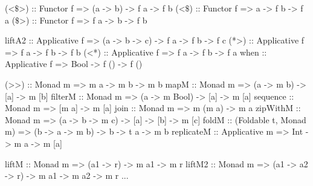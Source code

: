 \documentclass{article}
\begin{document}
\begin{hask}
(<$\$$>) :: Functor f => (a -> b) -> f a -> f b
(<$\$$) :: Functor f => a -> f b -> f a
($\$$>) :: Functor f => f a -> b -> f b

liftA2 :: Applicative f => (a -> b -> c) -> f a -> f b -> f c
(*>) :: Applicative f => f a -> f b -> f b
(<*) :: Applicative f => f a -> f b -> f a
when :: Applicative f => Bool -> f () -> f () 

(>>) :: Monad m => m a -> m b -> m b
mapM :: Monad m => (a -> m b) -> [a] -> m [b] 
filterM :: Monad m => (a -> m Bool) -> [a] -> m [a]
sequence  :: Monad m => [m a] -> m [a]
join :: Monad m => m (m a) -> m a
zipWithM :: Monad m => (a -> b -> m c) -> [a] -> [b] -> m [c] 
foldM :: (Foldable t, Monad m) => (b -> a -> m b) -> b -> t a -> m b 
replicateM :: Applicative m => Int -> m a -> m [a]

liftM :: Monad m => (a1 -> r) -> m a1 -> m r
liftM2 :: Monad m => (a1 -> a2 -> r) -> m a1 -> m a2 -> m r
...
\end{hask}
\end{document}
